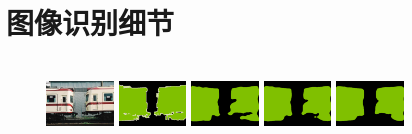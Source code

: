 \chapter{图像识别细节}

\begin{figure}[h]
\centering
		 \\
		\includegraphics[width=0.16\textwidth]{image/appendix1/2007_000042.jpg}
		\includegraphics[width=0.16\textwidth]{image/appendix1/2007_000042.png}
		\includegraphics[width=0.16\textwidth]{image/appendix1/1/2007_000042.png} 
		\includegraphics[width=0.16\textwidth]{image/appendix1/3/2007_000042.png}
		\includegraphics[width=0.16\textwidth]{image/appendix1/5/2007_000042.png} \\


\end{figure}
